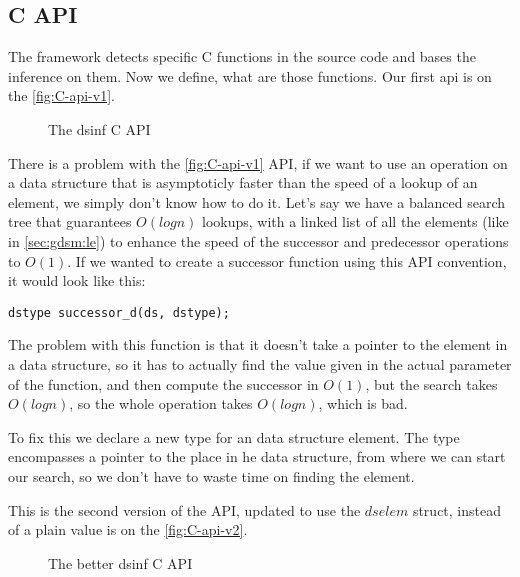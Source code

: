 \documentclass[a4paper,11pt]{article}
\begin{document}
	\subsection{C API}
        The framework detects specific C functions in the source code and bases the inference on them. Now we define,
        what are those functions. Our first api is on the \autoref{fig:C-api-v1}.

        \begin{figure}[h!]
            

            \caption{The dsinf C API}

            \label{fig:C-api-v1}
        \end{figure}

        There is a problem with the \autoref{fig:C-api-v1} API, if we want to use an operation on a data structure that
        is asymptoticly faster than the speed of a lookup of an element, we simply don't know how to do it. Let's say we
        have a balanced search tree that guarantees $O(log n)$ lookups, with a linked list of all the elements (like in
        \autoref{sec:gdsm:le}) to enhance the speed of the successor and predecessor operations to $O(1)$. If we wanted to create a
        successor function using this API convention, it would look like this:

        \begin{lstlisting}
dstype successor_d(ds, dstype);
        \end{lstlisting}
        The problem with this function is that it doesn't take a pointer to the element in a data structure, so it has
        to actually find the value given in the actual parameter of the function, and then compute the successor in
        $O(1)$, but the search takes $O(log n)$, so the whole operation takes $O(log n)$, which is bad.

        To fix this we declare a new type for an data structure element. The type encompasses a pointer to the place in
        he data structure, from where we can start our search, so we don't have to waste time on finding the element.

        This is the second version of the API, updated to use the $dselem$ struct, instead of a plain value is on the
        \autoref{fig:C-api-v2}.

        \begin{figure}[h!]
            

            \caption{The better dsinf C API}

            \label{fig:C-api-v2}
        \end{figure}
\end{document}

